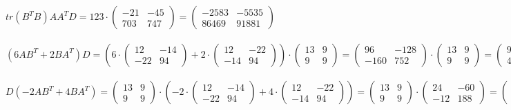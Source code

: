 \documentclass[a4paper, 12pt]{article}
\begin{document}
    \\
    \\ $tr(B^TB)AA^TD = 123 \cdot \begin{pmatrix}-21 & -45\\703 & 747\end{pmatrix} = \begin{pmatrix}-2583 & -5535\\86469 & 91881\end{pmatrix}$
    \\
    \\ $(6AB^T + 2BA^T)D = (6 \cdot \begin{pmatrix}12 & -14\\-22 & 94\end{pmatrix} + 2 \cdot \begin{pmatrix}12 & -22\\-14 & 94\end{pmatrix}) \cdot \begin{pmatrix}13 & 9\\9 & 9\end{pmatrix} = \begin{pmatrix}96 & -128\\-160 & 752\end{pmatrix} \cdot \begin{pmatrix}13 & 9\\9 & 9\end{pmatrix} = \begin{pmatrix}96 & -288\\4688 & 5328\end{pmatrix}$
    \\
    \\ $D(-2AB^T + 4BA^T) = \begin{pmatrix}13 & 9\\9 & 9\end{pmatrix} \cdot (-2 \cdot \begin{pmatrix}12 & -14\\-22 & 94\end{pmatrix} + 4 \cdot \begin{pmatrix}12 & -22\\-14 & 94\end{pmatrix}) = \begin{pmatrix}13 & 9\\9 & 9\end{pmatrix} \cdot \begin{pmatrix}24 & -60\\-12 & 188\end{pmatrix} = \begin{pmatrix}204 & 912\\108 & 1152\end{pmatrix}$
\end{document}
